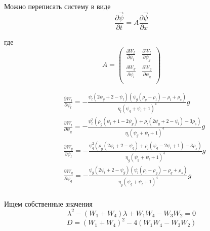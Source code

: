 \documentclass[12pt,a4paper]{article}
\newcommand{\pd}[2]{\frac{\partial #1}{\partial #2}}
\begin{document}
Можно переписать систему в виде
\begin{equation}
\frac{\partial \vec\psi}{\partial t}  = A \frac{\partial \vec\psi}{\partial x}
\end{equation}

где
\begin{equation}
A = \begin{pmatrix}
 \frac{\partial W_l}{\partial \psi_l} &  \frac{\partial W_l}{\partial \psi_g} \\
 \frac{\partial W_g}{\partial \psi_l} &  \frac{\partial W_g}{\partial \psi_g} \\
\end{pmatrix}	
\end{equation}

\begin{equation}
\begin{aligned}
&\pd{W_l}{\psi_l} = -\frac{\psi_l (2 \psi_g + 2 - \psi_l) (\psi_g (\rho_g-\rho_l)-\rho_l+\rho_s)}{\eta_l (\psi_g+\psi_l+1)^4} g\\
&\pd{W_l}{\psi_g} = -\frac{\psi_l^2 (\rho_g (\psi_l + 1 - 2 \psi_g)+\rho_l (2 \psi_g + 2 - \psi_l)- 3 \rho_s)}{\eta_l (\psi_g + \psi_l + 1)^4}g\\
&\pd{W_g}{\psi_l} = -\frac{\psi_g^2(\rho_g (2\psi_l + 2 - \psi_g)+\rho_l (\psi_g - 2 \psi_l + 1) - 3 \rho_s)}{\eta_g (\psi_g + \psi_l + 1)^4}g\\
&\pd{W_g}{\psi_g} = -\frac{\psi_g (2\psi_l + 2 - \psi_g) (\psi_l (\rho_l -\rho_g) - \rho_g + \rho_s)}{\eta_g (\psi_g + \psi_l + 1)^4}g\\
\end{aligned}
\end{equation}

Ищем собственные значения
\begin{equation}
\lambda^2 - (W_1 + W_4)\lambda + W_1 W_4 - W_3 W_2 = 0	
\end{equation}
\begin{equation}
D = (W_1 + W_4)^2 - 4(W_1 W_4 - W_3 W_2)	
\end{equation}
\end{document}
